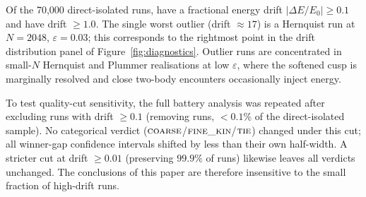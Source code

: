 \documentclass[twocolumn,linenumbers]{aastex701}
\newcommand{\heps}{\varepsilon}
\begin{document}
Of the 70{,}000 direct-isolated runs, \NOutlierDriftTenth{} have a
fractional energy drift $|\Delta E/E_0| \geq 0.1$ and \NOutlierDriftOne{}
have drift $\geq 1.0$.
The single worst outlier (drift $\approx 17$) is a Hernquist run at
$N = 2048$, $\heps = 0.03$; this corresponds to the rightmost point in the
drift distribution panel of Figure~\ref{fig:diagnostics}.
Outlier runs are concentrated in small-$N$ Hernquist and Plummer realisations
at low $\heps$, where the softened cusp is marginally resolved and close
two-body encounters occasionally inject energy.

To test quality-cut sensitivity, the full battery analysis was repeated
after excluding runs with drift $\geq 0.1$ (removing \NOutlierDriftTenth{} runs,
$< 0.1\%$ of the direct-isolated sample).
No categorical verdict ($\textsc{coarse}$/$\textsc{fine\_kin}$/$\textsc{tie}$)
changed under this cut; all winner-gap confidence intervals shifted by less
than their own half-width.
A stricter cut at drift $\geq 0.01$ (preserving $99.9\%$ of runs) likewise
leaves all verdicts unchanged.
The conclusions of this paper are therefore insensitive to the small fraction
of high-drift runs.

\clearpage
\end{document}
